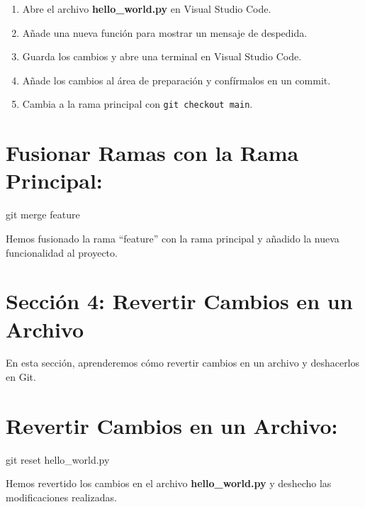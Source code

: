 \documentclass[
  a4paper,
  DIV=11,
  numbers=noendperiod,
  onepage,
  openany]{scrreprt}
\newenvironment{Shaded}{\begin{snugshade}}{\end{snugshade}}
\newcommand{\FunctionTok}[1]{\textcolor[rgb]{0.28,0.35,0.67}{#1}}
\newcommand{\NormalTok}[1]{\textcolor[rgb]{0.00,0.23,0.31}{#1}}
\providecommand{\tightlist}{%
  \setlength{\itemsep}{0pt}\setlength{\parskip}{0pt}}\usepackage{longtable,booktabs,array}
\begin{document}
\begin{enumerate}
\def\labelenumi{\arabic{enumi}.}
\tightlist
\item
  Abre el archivo \textbf{hello\_world.py} en Visual Studio Code.
\item
  Añade una nueva función para mostrar un mensaje de despedida.
\item
  Guarda los cambios y abre una terminal en Visual Studio Code.
\item
  Añade los cambios al área de preparación y confírmalos en un commit.
\item
  Cambia a la rama principal con \texttt{git\ checkout\ main}.
\end{enumerate}

\section{Fusionar Ramas con la Rama
Principal:}\label{fusionar-ramas-con-la-rama-principal}

\begin{Shaded}
\begin{Highlighting}[]
\FunctionTok{git}\NormalTok{ merge feature}
\end{Highlighting}
\end{Shaded}

Hemos fusionado la rama ``feature'' con la rama principal y añadido la
nueva funcionalidad al proyecto.

\section{Sección 4: Revertir Cambios en un
Archivo}\label{secciuxf3n-4-revertir-cambios-en-un-archivo}

En esta sección, aprenderemos cómo revertir cambios en un archivo y
deshacerlos en Git.

\section{Revertir Cambios en un
Archivo:}\label{revertir-cambios-en-un-archivo}

\begin{Shaded}
\begin{Highlighting}[]
\FunctionTok{git}\NormalTok{ reset hello\_world.py}
\end{Highlighting}
\end{Shaded}

Hemos revertido los cambios en el archivo \textbf{hello\_world.py} y
deshecho las modificaciones realizadas.
\end{document}
